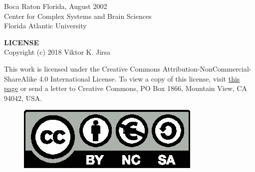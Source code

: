 \documentclass[11pt]{article}
\begin{document}
\begin{figure}[!h]

    \centerline{\epsfxsize=10cm  }

\end{figure} \vs \svs



\begin{center} \Large

\textrm{Boca Raton Florida, August 2002 \\
     Center for Complex Systems and Brain Sciences \\
     Florida Atlantic University}
\end{center}  \normalsize



\newpage

\vspace{5cm}
\begin{center} \Large
  \textrm{{\bf LICENSE}\\
    \vs
    Copyright (c) 2018 Viktor K. Jirsa}
\end{center} \normalsize \vs \svs



This work is licensed under the Creative Commons Attribution-NonCommercial-ShareAlike 4.0 International License. 
To view a copy of this license, visit \href{http://creativecommons.org/licenses/by-nc-sa/4.0/}{this page} or send a letter 
to Creative Commons, PO Box 1866, Mountain View, CA 94042, USA.

\vspace{3cm}

\begin{figure}

    \centerline{\epsfxsize=11cm \includegraphics{CC-license.eps}}

\end{figure} \vs \svs



\newpage

\tableofcontents

\listoffigures



\newpage

\pagestyle{plain}



  \newpage

  \newpage

  \newpage

  \newpage


\end{document}
